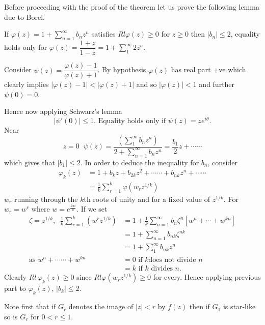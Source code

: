 Before proceeding with the proof of the theorem let us prove the
following lemma due to Borel.

\begin{lem}\label{part3-lem2}
If $\varphi(z)=1+\sum\limits^{\infty}_{n=1}b_{n}z^{n}$ satisfies
$Rl\varphi(z)\geq 0$ for $z\geq 0$ then $|b_{n}|\leq 2$, equality
holds only for $\varphi(z)=\dfrac{1+z}{1-z}=1+\sum\limits^{\infty}_{1}2z^{n}$.
\end{lem}

Consider $\psi(z)=\dfrac{\varphi(z)-1}{\varphi(z)+1}$. By hypothesis
$\varphi(z)$ has real part $+$ve which clearly implies
$|\varphi(z)-1|<|\varphi(z)+1|$ and so $|\varphi(z)|<1$ and further
$\psi(0)=0$.

Hence now applying Schwarz's lemma
$$
|\psi'(0)|\leq 1.\text{ \ Equality holds only if \ } \psi(z)=ze^{i\theta}.
$$
Near
$$
z=0 \;\;\psi(z)=\frac{\left(\sum\limits^{\infty}_{1}b_{n}z^{n}\right)}{2+\sum\limits^{\infty}_{n=1}b_{n}z^{n}}=\frac{b_{1}}{2}z+\cdots\cdots 
$$
which gives that $|b_{1}|\leq 2$. In order to deduce the inequality
for $b_{n}$, consider
\begin{align*}
\varphi_{k}(z) &=
1+b_{k}z+b_{2k}z^{2}+\cdots\cdots+b_{nk}z^{n}+\cdots\cdots\\
&= \frac{1}{k}\sum^{k}_{r=1}\varphi(w_{r}z^{1/k})
\end{align*}
$w_{r}$ running through the $k$th roots of unity and for a fixed value
of $z^{1/k}$. For $w_{r}=w^{r}$ where $w=e^{\frac{2\pi i}{k}}$. If we
set 
\begin{align*}
\zeta=z^{1/k},\;\;\frac{1}{k}\sum^{k}_{r=1}(w^{r}z^{1/k}) &=
1+\frac{1}{k}\sum^{\infty}_{n=1}b_{n}\zeta^{n}[w^{n}+\cdots+w^{kn}]\\
&= 1+\sum^{\infty}_{n=1}b_{nk}\zeta^{nk}\\
&= 1+\sum^{\infty}_{1}b_{nk}z^{n}\\
\text{as \ } w^{n}+\cdots\cdots+w^{kn} &=0\text{ \ if \ } k\text{
  \  does not divide \ } n\\
&= k \text{ \ if  \ } k \text{ \ divides \ }n.
\end{align*}\pageoriginale
Clearly $Rl \,\varphi_{k}(z)\geq 0$ since $Rl\varphi(w_{r}z^{1/k})\geq 0$
for every. Hence applying previous part to $\varphi_{k}(z)$,
$|b_{k}|\leq 2$.

\setcounter{proofofthm}{7}
\begin{proofofthm}\label{proofofthm8}
Note first that if $G_{r}$ denotes the image of $|z|<r$ by $f(z)$ then
if $G_{1}$ is star-like so is $G_{r}$ for $0<r\leq 1$.
\end{proofofthm}

